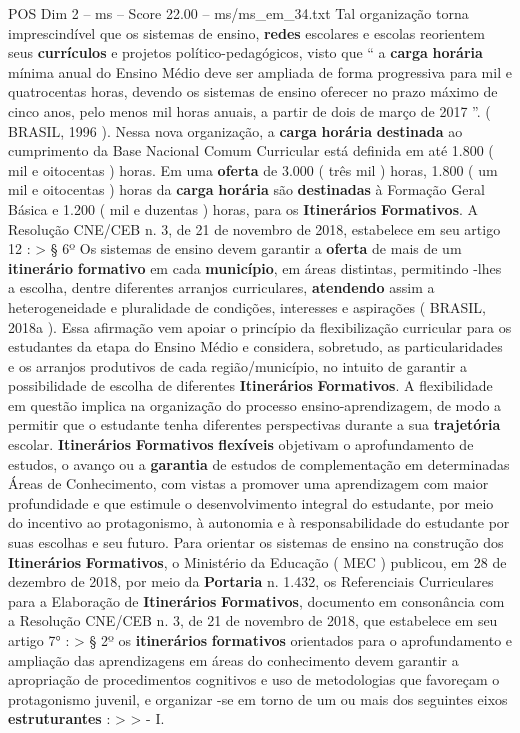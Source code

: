 \begin{textsample}{POS Dim 2 – ms – Score 22.00 – ms/ms\_em\_34.txt}
Tal organização torna imprescindível que os sistemas de ensino, \textbf{redes} escolares e escolas reorientem seus \textbf{currículos} e projetos político-pedagógicos, visto que “ a \textbf{carga} \textbf{horária} mínima anual do Ensino Médio deve ser ampliada de forma progressiva para mil e quatrocentas horas, devendo os sistemas de ensino oferecer no prazo máximo de cinco anos, pelo menos mil horas anuais, a partir de dois de março de 2017 ”. ( BRASIL, 1996 ).
Nessa nova organização, a \textbf{carga} \textbf{horária} \textbf{destinada} ao cumprimento da Base Nacional Comum Curricular está definida em até 1.800 ( mil e oitocentas ) horas.
Em uma \textbf{oferta} de 3.000 ( três mil ) horas, 1.800 ( um mil e oitocentas ) horas da \textbf{carga} \textbf{horária} são \textbf{destinadas} à Formação Geral Básica e 1.200 ( mil e duzentas ) horas, para os \textbf{Itinerários} \textbf{Formativos}.
A Resolução CNE/CEB n. 3, de 21 de novembro de 2018, estabelece em seu artigo 12 : > § 6º Os sistemas de ensino devem garantir a \textbf{oferta} de mais de um \textbf{itinerário} \textbf{formativo} em cada \textbf{município}, em áreas distintas, permitindo -lhes a escolha, dentre diferentes arranjos curriculares, \textbf{atendendo} assim a heterogeneidade e pluralidade de condições, interesses e aspirações ( BRASIL, 2018a ).
Essa afirmação vem apoiar o princípio da flexibilização curricular para os estudantes da etapa do Ensino Médio e considera, sobretudo, as particularidades e os arranjos produtivos de cada região/município, no intuito de garantir a possibilidade de escolha de diferentes \textbf{Itinerários} \textbf{Formativos}.
A flexibilidade em questão implica na organização do processo ensino-aprendizagem, de modo a permitir que o estudante tenha diferentes perspectivas durante a sua \textbf{trajetória} escolar. \textbf{Itinerários} \textbf{Formativos} \textbf{flexíveis} objetivam o aprofundamento de estudos, o avanço ou a \textbf{garantia} de estudos de complementação em determinadas Áreas de Conhecimento, com vistas a promover uma aprendizagem com maior profundidade e que estimule o desenvolvimento integral do estudante, por meio do incentivo ao protagonismo, à autonomia e à responsabilidade do estudante por suas escolhas e seu futuro.
Para orientar os sistemas de ensino na construção dos \textbf{Itinerários} \textbf{Formativos}, o Ministério da Educação ( MEC ) publicou, em 28 de dezembro de 2018, por meio da \textbf{Portaria} n. 1.432, os Referenciais Curriculares para a Elaboração de \textbf{Itinerários} \textbf{Formativos}, documento em consonância com a Resolução CNE/CEB n. 3, de 21 de novembro de 2018, que estabelece em seu artigo 7{\EmojiFont °} : > § 2º os \textbf{itinerários} \textbf{formativos} orientados para o aprofundamento e ampliação das aprendizagens em áreas do conhecimento devem garantir a apropriação de procedimentos cognitivos e uso de metodologias que favoreçam o protagonismo juvenil, e organizar -se em torno de um ou mais dos seguintes eixos \textbf{estruturantes} : > > - I.

\end{textsample}
